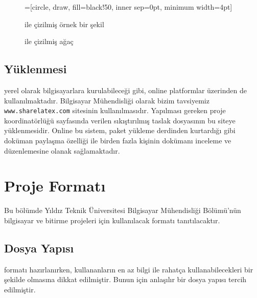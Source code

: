 \begin{figure}[!ht]
  \centering
{}=[circle, draw, fill=black!50,
                        inner sep=0pt, minimum width=4pt]
  \caption{\latex ile çizilmiş örnek bir şekil}
  \label{fig:ornekgrafik}
\end{figure}

\begin{figure}[!ht]
  \centering
\usetikzlibrary{lindenmayersystems}
\usetikzlibrary[shadings]
  \caption{\latex ile çizilmiş ağaç}
  \label{fig:ornekgrafik2}
\end{figure}

\section{\latex Yüklenmesi}
\latex yerel olarak bilgisayarlara kurulabileceği gibi, online platformlar üzerinden de kullanılmaktadır. Bilgisayar Mühendisliği olarak bizim tavsiyemiz \texttt{www.sharelatex.com} sitesinin kullanılmasıdır. Yapılması gereken proje koordinatörlüğü sayfasında verilen sıkıştırılmış \latex taslak dosyasının bu siteye yüklenmesidir. Online bu sistem, paket yükleme derdinden kurtardığı gibi doküman paylaşma özelliği ile birden fazla kişinin dokümanı inceleme ve düzenlemesine olanak sağlamaktadır. 

\chapter{Proje \latex Formatı}

Bu bölümde Yıldız Teknik Üniversitesi Bilgisayar Mühendisliği Bölümü'nün bilgisayar ve bitirme projeleri için kullanılacak \latex formatı tanıtılacaktır.

\section{Dosya Yapısı}
\latex formatı hazırlanırken, kullananların en az bilgi ile rahatça kullanabilecekleri bir şekilde olmasına dikkat edilmiştir. Bunun için anlaşılır bir dosya yapısı tercih edilmiştir. 

